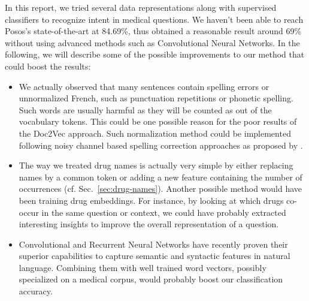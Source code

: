 \documentclass[11pt,twocolumn,letterpaper]{article}
\begin{document}
In this report, we tried several data representations along with supervised classifiers to recognize intent in medical questions. We haven't been able to reach Posos's state-of-the-art at 84.69\%, thus obtained a reasonable result around 69\% without using advanced methods such as Convolutional Neural Networks. In the following, we will describe some of the possible improvements to our method that could boost the results:
\begin{itemize}
\item We actually observed that many sentences contain spelling errors or unnormalized French, such as punctuation repetitions or phonetic spelling. Such words are usually harmful as they will be counted as out of the vocabulary tokens. This could be one possible reason for the poor results of the Doc2Vec approach. Such normalization method could be implemented following noisy channel based spelling correction approaches as proposed by \cite{kernighan1990spelling}. 

\item The way we treated drug names is actually very simple by either replacing names by a common token or adding a new feature containing the number of occurrences (cf. Sec.~\ref{sec:drug-names}). Another possible method would have been training drug embeddings. For instance, by looking at which drugs co-occur in the same question or context, we could have probably extracted interesting insights to improve the overall representation of a question. 

\item Convolutional and Recurrent Neural Networks have recently proven their superior capabilities to capture semantic and syntactic features in natural language. Combining them with well trained word vectors, possibly specialized on a medical corpus, would probably boost our classification accuracy.
\end{itemize}


{\small


}
\end{document}
